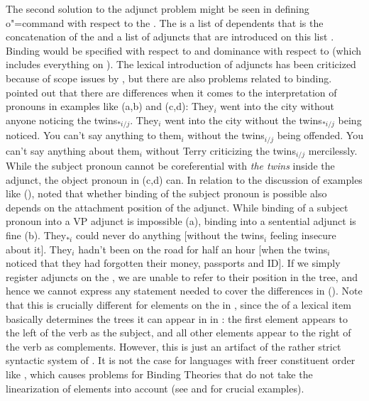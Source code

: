 \documentclass[output=paper,biblatex,babelshorthands,newtxmath,draftmode,colorlinks,citecolor=brown]{langscibook}
\begin{document}
The second solution to the adjunct problem might be seen in defining o"=command with respect to the \depsl. The \depsl is a list
of dependents that is the concatenation of the \argstl and a list of adjuncts that are introduced on
this list \citep*[]{BMS2001a}. Binding would be specified with respect to \argst and dominance with
respect to \deps (which includes everything on \argst). The lexical introduction of adjuncts has
been criticized because of scope issues by \citet[]{LH2006a}, but there are also problems related to
binding. \citet[]{HL96a} pointed out that there are differences when it comes to the
interpretation of pronouns in examples like (a,b) and (c,d):
\eal
\ex They$_i$ went into the city without anyone noticing the twins$_{*i/j}$.
\ex They$_i$ went into the city without the twins$_{*i/j}$ being noticed.
\ex You can't say anything to them$_i$ without the twins$_{i/j}$ being offended.
\ex You can't say anything about them$_i$ without Terry criticizing the twins$_{i/j}$ mercilessly.
\zl
While the subject pronoun cannot be coreferential with \emph{the twins} inside the adjunct, the object pronoun in
(c,d) can.
In relation to the discussion of examples like (), \citet[]{Walker2011a} noted that whether binding of the subject pronoun is possible also
depends on the attachment position of the adjunct. While binding of a subject pronoun into a VP
adjunct is impossible (a), binding into a sentential adjunct is fine (b).
\ealnoraggedright
\ex They$_{*i}$ could never do anything [without the twins$_i$ feeling insecure about it].
\ex They$_i$ hadn’t been on the road for half an hour [when the twins$_i$ noticed that they had forgotten their money, passports and ID].
\zl
If we simply register adjuncts on the \depsl, we are unable to refer to their
position in the tree, and hence we cannot express any statement needed to cover the differences in
(). Note that this is crucially different for elements on the \argstl in , since the \argst of a lexical item
basically determines the trees it can appear in in : the first element appears to the left of
the verb as the subject, and all other elements appear to the right of the verb as complements. However,
this is just an artifact of the rather strict syntactic system of . It is not the case for
languages with freer constituent order like , which causes problems for Binding Theories that do not
take the linearization of elements into account (see \citealp[]{Grewendorf85a} and
\citealp[]{Riezler95a} for crucial examples).
\end{document}
